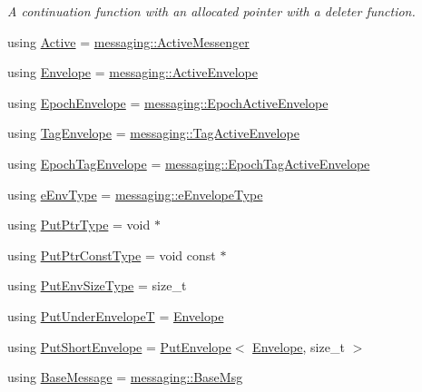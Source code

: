 \begin{DoxyCompactItemize}
\begin{DoxyCompactList}\small\item\em A continuation function with an allocated pointer with a deleter function. \end{DoxyCompactList}\item 
using \hyperlink{namespacevt_ad548cc368cddb926753ac237eb454dae}{Active} = \hyperlink{structvt_1_1messaging_1_1_active_messenger}{messaging\+::\+Active\+Messenger}
\item 
using \hyperlink{namespacevt_aa9c8cc094b5361482021d63012987814}{Envelope} = \hyperlink{structvt_1_1messaging_1_1_active_envelope}{messaging\+::\+Active\+Envelope}
\item 
using \hyperlink{namespacevt_af71a025689a3da5037785b53a7a8e78c}{Epoch\+Envelope} = \hyperlink{structvt_1_1messaging_1_1_epoch_active_envelope}{messaging\+::\+Epoch\+Active\+Envelope}
\item 
using \hyperlink{namespacevt_a7b951ab92dca9319e12e3fc406ccb309}{Tag\+Envelope} = \hyperlink{structvt_1_1messaging_1_1_tag_active_envelope}{messaging\+::\+Tag\+Active\+Envelope}
\item 
using \hyperlink{namespacevt_af23b58014ced6898422213a0e5e6a27a}{Epoch\+Tag\+Envelope} = \hyperlink{structvt_1_1messaging_1_1_epoch_tag_active_envelope}{messaging\+::\+Epoch\+Tag\+Active\+Envelope}
\item 
using \hyperlink{namespacevt_abdfe9ac50e3799705ee21853c1509bf6}{e\+Env\+Type} = \hyperlink{namespacevt_1_1messaging_a6508ef3a4701a2e6fd0bfe3edcc63a6c}{messaging\+::e\+Envelope\+Type}
\item 
using \hyperlink{namespacevt_a537693bfe0223c71eb52bdbd6ea2c741}{Put\+Ptr\+Type} = void $\ast$
\item 
using \hyperlink{namespacevt_a494d6c6dc5cdb9a8d61eaedfa2c4d4f3}{Put\+Ptr\+Const\+Type} = void const  $\ast$
\item 
using \hyperlink{namespacevt_aa241444e21c15238e185923792814fe4}{Put\+Env\+Size\+Type} = size\+\_\+t
\item 
using \hyperlink{namespacevt_a233c004b26ccd826ef10686169371e01}{Put\+Under\+EnvelopeT} = \hyperlink{namespacevt_aa9c8cc094b5361482021d63012987814}{Envelope}
\item 
using \hyperlink{namespacevt_a8d7a7de9e76bfea1600009a775b7298c}{Put\+Short\+Envelope} = \hyperlink{structvt_1_1_put_envelope}{Put\+Envelope}$<$ \hyperlink{namespacevt_aa9c8cc094b5361482021d63012987814}{Envelope}, size\+\_\+t $>$
\item 
using \hyperlink{namespacevt_ac34f95a5e2b8109b55bfba52b074443d}{Base\+Message} = \hyperlink{structvt_1_1messaging_1_1_base_msg}{messaging\+::\+Base\+Msg}

\end{DoxyCompactItemize}
